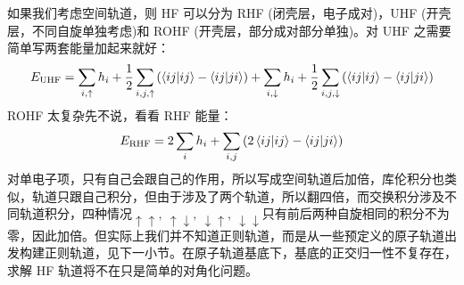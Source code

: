 如果我们考虑空间轨道，则 HF 可以分为 RHF (闭壳层，电子成对)，UHF (开壳层，不同自旋单独考虑)和 ROHF (开壳层，部分成对部分单独)。对 UHF 之需要简单写两套能量加起来就好：
\[E_{\rm{UHF}}=\sum_{i,\uparrow}h_i+\frac{1}{2}\sum_{i,j,\uparrow}\left(\bra{ij}\ket{ij}-\bra{ij}\ket{ji}\right)+\sum_{i,\downarrow}h_i+\frac{1}{2}\sum_{i,j,\downarrow}\left(\bra{ij}\ket{ij}-\bra{ij}\ket{ji}\right)\]
ROHF 太复杂先不说，看看 RHF 能量：
\[E_{\rm{RHF}}=2\sum_ih_i+\sum_{i,j}\left(2\bra{ij}\ket{ij}-\bra{ij}\ket{ji}\right)\]
对单电子项，只有自己会跟自己的作用，所以写成空间轨道后加倍，库伦积分也类似，轨道只跟自己积分，但由于涉及了两个轨道，所以翻四倍，而交换积分涉及不同轨道积分，四种情况$\uparrow\uparrow, \ \uparrow\downarrow, \ \downarrow\uparrow, \ \downarrow\downarrow$只有前后两种自旋相同的积分不为零，因此加倍。但实际上我们并不知道正则轨道，而是从一些预定义的原子轨道出发构建正则轨道，见下一小节。在原子轨道基底下，基底的正交归一性不复存在，求解 HF 轨道将不在只是简单的对角化问题。


